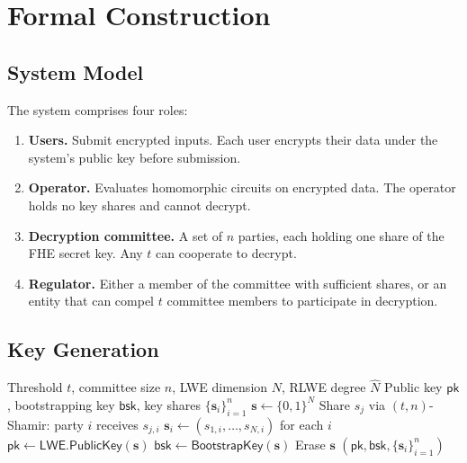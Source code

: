 \section{Formal Construction}

\label{sec:construction}

\subsection{System Model}

The system comprises four roles:

\begin{enumerate}[nosep]
  \item \textbf{Users.}  Submit encrypted inputs.  Each user encrypts
        their data under the system's public key before submission.
  \item \textbf{Operator.}  Evaluates homomorphic circuits on encrypted
        data.  The operator holds no key shares and cannot decrypt.
  \item \textbf{Decryption committee.}  A set of $n$ parties, each
        holding one share of the FHE secret key.  Any $t$ can
        cooperate to decrypt.
  \item \textbf{Regulator.}  Either a member of the committee with
        sufficient shares, or an entity that can compel $t$ committee
        members to participate in decryption.
\end{enumerate}

\subsection{Key Generation}

\begin{algorithm}[H]
\caption{Threshold FHE Key Generation}
\label{alg:keygen}
\begin{algorithmic}[1]
\Require Threshold $t$, committee size $n$, LWE dimension $N$,
         RLWE degree $\hat{N}$
\Ensure Public key $\mathsf{pk}$, bootstrapping key $\mathsf{bsk}$,
        key shares $\{\mathbf{s}_i\}_{i=1}^n$
\State $\mathbf{s} \leftarrow \{0,1\}^N$ 
  \State Share $s_j$ via $(t,n)$-Shamir: party $i$ receives $s_{j,i}$
\EndFor
\State $\mathbf{s}_i \leftarrow (s_{1,i}, \ldots, s_{N,i})$ for each $i$
\State $\mathsf{pk} \leftarrow \mathsf{LWE.PublicKey}(\mathbf{s})$
\State $\mathsf{bsk} \leftarrow \mathsf{BootstrapKey}(\mathbf{s})$
\State Erase $\mathbf{s}$ 
\State \Return $(\mathsf{pk}, \mathsf{bsk}, \{\mathbf{s}_i\}_{i=1}^n)$
\end{algorithmic}
\end{algorithm}

